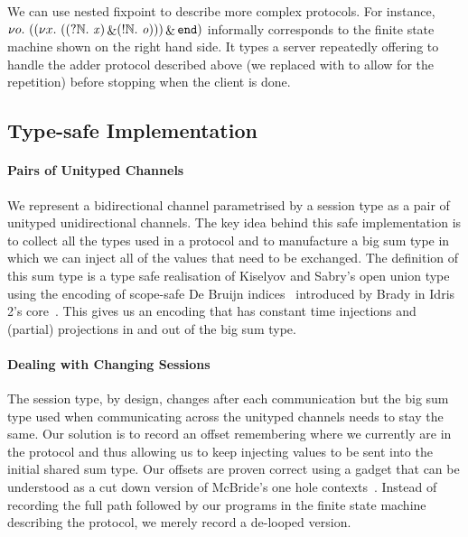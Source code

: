 \documentclass{easychair}
\begin{document}
We can use nested fixpoint to describe more complex
protocols. For instance,
$
\nu o.~(
  (\nu x.~((?\mathbb{N}.~\mathit{x}) \mathop{\&} (!\mathbb{N}.~\mathit{o}))
  ) \mathop{\&} \mathtt{end})
$
informally corresponds to the finite state machine
shown on the right hand side.
It types a server repeatedly offering to handle the adder
protocol described above (we replaced \stopsesh{} with
 to allow for the repetition) before stopping
when the client is done.


\subsection*{Type-safe Implementation}

\paragraph{Pairs of Unityped Channels}
We represent a bidirectional channel
parametrised by a session type as a pair of unityped
unidirectional channels.
%
The key idea behind this safe implementation is to collect
all the types used in a protocol and to manufacture a big
sum type in which we can inject all of the values that need
to be exchanged.
%
The definition of this sum type is a type safe realisation of
Kiselyov and Sabry's open union type~\cite{DBLP:conf/haskell/KiselyovSS13}
using the encoding of scope-safe
De Bruijn indices~\cite{MANUAL:journals/math/debruijn72}
introduced by Brady in Idris 2's core~\cite{DBLP:conf/ecoop/Brady21}.
%
This gives us an encoding that has constant time injections and
(partial) projections in and out of the big sum type.

\paragraph{Dealing with Changing Sessions}
The session type, by design, changes after each communication
but the big sum type used when communicating across the
unityped channels needs to stay the same.
%
Our solution is to record an offset remembering where we currently
are in the protocol and thus allowing us to keep injecting values to
be sent into the initial shared sum type.
%
Our offsets are proven correct using a gadget that can be understood
as a cut down version of McBride's one hole
contexts~\cite{DBLP:conf/popl/McBride08}. Instead
of recording the full path followed by our programs in the finite
state machine describing the protocol,
we merely record a de-looped version.
\end{document}
